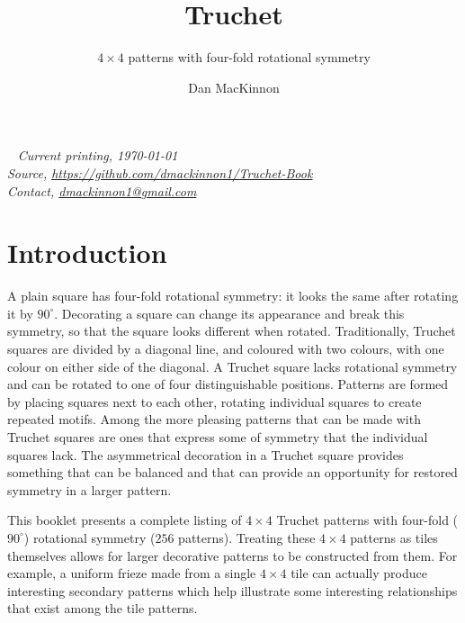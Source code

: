 \documentclass{tufte-book}
\title{Truchet}
\subtitle{\texorpdfstring{$4\times4$}{4x4} patterns with four-fold rotational symmetry}
\author[]{Dan MacKinnon}
\begin{document}



\maketitle


\newpage
\begin{fullwidth}
~\vfill
\thispagestyle{empty}
\setlength{\parindent}{0pt}
\textit{Current printing, \today}\\
\textit{Source, \url{https://github.com/dmackinnon1/Truchet-Book}}\\
\textit{Contact, \href{mailto://dmackinnon1@gmail.com}{dmackinnon1@gmail.com}}
\end{fullwidth}

\cleardoublepage

\chapter*{Introduction}

\noindent
\marginnote{\centering}A plain square has four-fold rotational symmetry: it looks the same after rotating it by $90^{\circ}$. Decorating a square can change its appearance and break this symmetry, so that the square looks different when rotated. Traditionally, Truchet squares are divided by a diagonal line, and coloured with two colours, with one colour on either side of the diagonal. A Truchet square lacks rotational symmetry and can be rotated to one of four distinguishable positions. \marginnote[3\baselineskip]{\centering}Patterns are formed by placing squares next to each other, rotating individual squares to create repeated motifs. Among the more pleasing patterns that can be made with Truchet squares are ones that express some of symmetry that the individual squares lack. The asymmetrical decoration in a Truchet square provides something that can be balanced and that can provide an opportunity for restored symmetry in a larger pattern. 

\vspace{0.3cm}
\noindent
This booklet presents a complete listing of $4\times 4$ Truchet patterns with four-fold ($90^{\circ}$) rotational symmetry ($256$ patterns).  Treating these $4\times 4$ patterns as tiles themselves allows for larger decorative patterns to be constructed from them. For example, a uniform frieze made from a single $4\times 4$ tile can actually produce interesting secondary patterns which help illustrate some interesting relationships that exist among the tile patterns.  
\end{document}
